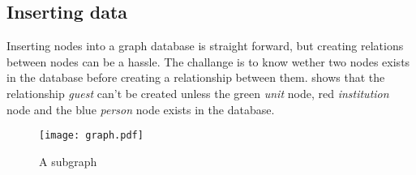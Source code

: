 \subsection*{Inserting data}
Inserting nodes into a graph database is straight forward, but creating relations between nodes can be a hassle. The challange is to know wether two nodes exists in the database before creating a relationship between them.  shows that the relationship \textit{guest} can't be created unless the green \textit{unit} node, red \textit{institution} node and the blue \textit{person} node exists in the database. 

\begin{figure}[h]
  \centering
  \texttt{[image: graph.pdf]}
  \caption{A subgraph}
  \label{fig:subgraph}
\end{figure}
